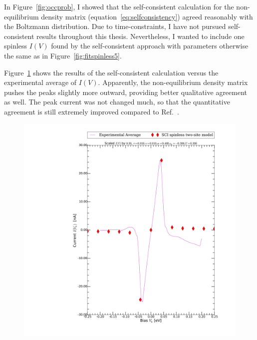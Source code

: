 In Figure~\ref{fig:occprob}, I showed that the self-consistent calculation for the non-equilibrium density matrix (equation~\ref{eq:selfconsistency}) agreed reasonably with the Boltzmann distribution. Due to time-constraints, I have not pursued self-consistent results throughout this thesis. Nevertheless, I wanted to include one spinless $I(V)$ found by the self-consistent approach with parameters otherwise the same as in Figure~\ref{fig:fitspinless5}.

Figure~\ref{fig:figselfconsistent} shows the results of the self-consistent calculation versus the experimental average of $I(V)$. Apparently, the non-equilibrium density matrix pushes the peaks slightly more outward, providing better qualitative agreement as well. The peak current was not changed much, so that the quantitative agreement is still extremely improved compared to Ref.~\cite{perrinnano}.


\begin{figure}[htb]
    \centering
    \includegraphics[width=.95\textwidth, clip=true, trim=11cm 2cm 2cm 0cm]{pdf/selfconsistent_fit_current_0.pdf}
    \caption{ }
    \label{fig:figselfconsistent}
\end{figure} 

\clearpage
{}